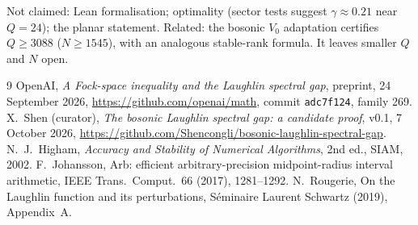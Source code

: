 \documentclass[11pt]{amsart}
\theoremstyle{remark}
\begin{document}
Not claimed: Lean formalisation; optimality (sector tests suggest $\gamma\approx0.21$ near $Q=24$);
the planar statement. Related: the bosonic $V_0$ adaptation \cite{Shen} certifies $Q\ge3088$ ($N\ge1545$),
with an analogous stable-rank formula. It leaves smaller $Q$ and $N$ open.

\begin{thebibliography}{9}
 OpenAI, \emph{A Fock-space inequality and the Laughlin spectral gap}, preprint, 24 September 2026,
\url{https://github.com/openai/math}, commit \texttt{adc7f124}, family 269.
 X.~Shen (curator), \emph{The bosonic Laughlin spectral gap: a candidate proof}, v0.1, 7 October 2026,
\url{https://github.com/Shencongli/bosonic-laughlin-spectral-gap}.
 N.~J.~Higham, \emph{Accuracy and Stability of Numerical Algorithms}, 2nd ed., SIAM, 2002.
 F.~Johansson, Arb: efficient arbitrary-precision midpoint-radius interval arithmetic,
IEEE Trans.\ Comput.\ 66 (2017), 1281--1292.
 N.~Rougerie, On the Laughlin function and its perturbations, S\'eminaire Laurent Schwartz (2019), Appendix~A.
\end{thebibliography}
\end{document}
